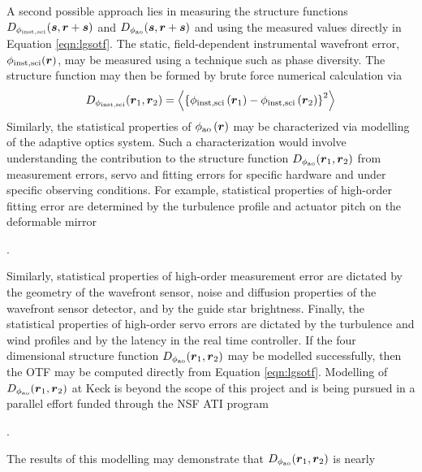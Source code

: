 A second possible approach lies in measuring the structure functions
$D_{\rm \phi_{inst,sci}}(\boldsymbol{s}, \boldsymbol{r} +\boldsymbol{s} )$ 
and
$D_{\rm \phi_{ao}}(\boldsymbol{s}, \boldsymbol{r} + \boldsymbol{s})$
and using the measured values directly in Equation
\ref{eqn:lgsotf}.  The static, field-dependent instrumental wavefront
error, $\phi_{\rm inst,sci}(\boldsymbol{r})$, may be measured using a technique 
such as phase diversity.  The
structure function may then be formed by brute force numerical
calculation via
\begin{equation}
\label{eqn:strfn_inst}
D_{\rm \phi_{inst,sci}}(\boldsymbol{r}_{1}, \boldsymbol{r}_{2})  = 
\left\langle \left\{\phi_{\rm inst,sci}\left(\boldsymbol{r}_{1}\right) - 
\phi_{\rm inst,sci}\left(\boldsymbol{r}_{2}\right)\right\}^{2}\right\rangle
\end{equation}
Similarly, the statistical properties of $\phi_{\rm
  ao}\left(\boldsymbol{r}\right)$ may be characterized via modelling
of the adaptive optics system.  Such a characterization would involve
understanding the contribution to the structure function $D_{\rm
  \phi_{ao}}(\boldsymbol{r}_{1},\boldsymbol{r}_{2})$ from measurement errors,
servo and fitting errors for specific hardware and under specific
observing conditions.  For example, statistical properties of 
high-order fitting error are determined by the turbulence profile and
actuator pitch on the deformable mirror
\begin{notes}
[CITE].
\end{notes}
Similarly, statistical
properties of high-order measurement error are dictated by the
geometry of the wavefront sensor, noise and diffusion properties of
the wavefront sensor detector, and by the guide star brightness.  Finally,
the statistical properties of high-order servo errors are dictated by the
turbulence and wind profiles and by the latency in the real time
controller.  If the four dimensional structure function $D_{\rm
  \phi_{ao}}(\boldsymbol{r}_{1},\boldsymbol{r}_{2})$ may be modelled
successfully, then the OTF may be computed
directly from Equation \ref{eqn:lgsotf}.  Modelling of $D_{\rm
  \phi_{ao}}(\boldsymbol{r}_{1},\boldsymbol{r}_{2})$ at Keck is beyond 
the scope of this project and is being pursued in a parallel effort funded 
through the NSF ATI program 
\begin{notes}
.
\end{notes}
The results of this modelling may demonstrate that 
$D_{\rm \phi_{ao}}(\boldsymbol{r}_{1},\boldsymbol{r}_{2})$ is nearly
